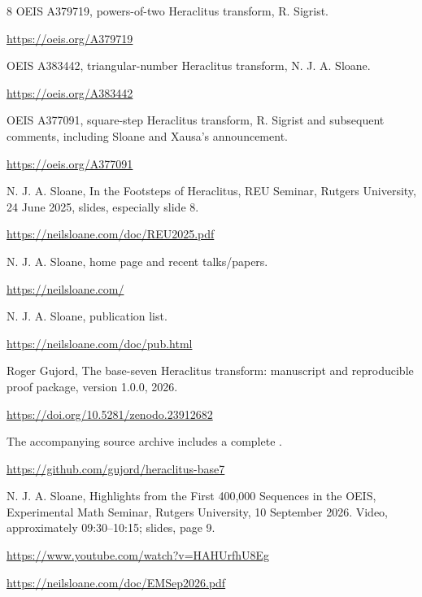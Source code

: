\documentclass[11pt,a4paper]{article}
\begin{document}
\clearpage
\begin{thebibliography}{8}
 OEIS A379719, powers-of-two Heraclitus transform, R. Sigrist.
\par\mbox{\small\url{https://oeis.org/A379719}}

 OEIS A383442, triangular-number Heraclitus transform, N. J. A. Sloane.
\par\mbox{\small\url{https://oeis.org/A383442}}

 OEIS A377091, square-step Heraclitus transform, R. Sigrist and subsequent comments, including Sloane and Xausa's announcement.
\par\mbox{\small\url{https://oeis.org/A377091}}

 N. J. A. Sloane, In the Footsteps of Heraclitus, REU Seminar, Rutgers University, 24 June 2025, slides, especially slide 8.
\par\mbox{\small\url{https://neilsloane.com/doc/REU2025.pdf}}

 N. J. A. Sloane, home page and recent talks/papers.
\par\mbox{\small\url{https://neilsloane.com/}}

 N. J. A. Sloane, publication list.
\par\mbox{\small\url{https://neilsloane.com/doc/pub.html}}

 Roger Gujord, The base-seven Heraclitus transform:
manuscript and reproducible proof package, version 1.0.0, 2026.
\par\mbox{\small\url{https://doi.org/10.5281/zenodo.23912682}}
\par The accompanying source
archive includes a complete .
\par\mbox{\small\url{https://github.com/gujord/heraclitus-base7}}

 N. J. A. Sloane, Highlights from the First 400,000
Sequences in the OEIS, Experimental Math Seminar, Rutgers University,
10 September 2026. Video, approximately 09:30--10:15; slides, page 9.
\par\mbox{\small\url{https://www.youtube.com/watch?v=HAHUrfhU8Eg}}
\par\mbox{\small\url{https://neilsloane.com/doc/EMSep2026.pdf}}

\end{thebibliography}

\clearpage

\end{document}
